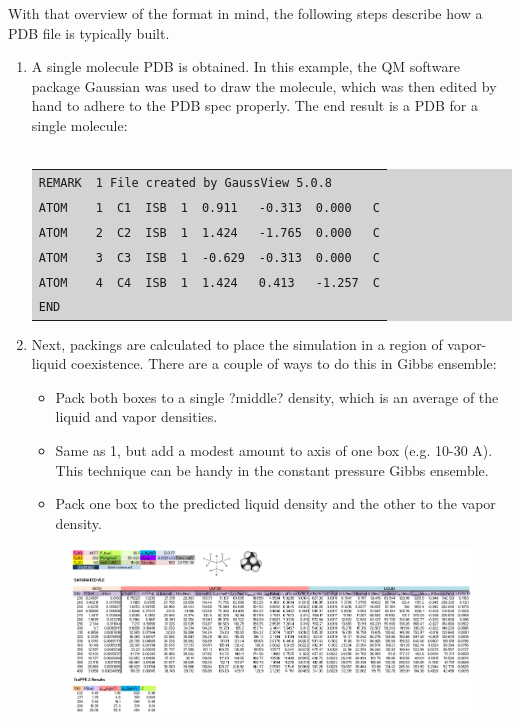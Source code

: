 With that overview of the format in mind, the following steps describe how a PDB file is typically built.\\
\begin{enumerate}
\item A single molecule PDB is obtained. In this example, the QM software package Gaussian was used to draw the molecule, which was then edited by hand to adhere to the PDB spec properly. The end result is a PDB for a single molecule:\\\\
\colorbox{lightgray}{
\begin{tabular}{*9l }
  \texttt{REMARK} & \multicolumn{8}{l}{\texttt{1 File created by GaussView 5.0.8}}  \\
  \texttt{ATOM} & \texttt{1} & \texttt{C1} & \texttt{ISB} & \texttt{1} & \texttt{0.911} & \texttt{-0.313} & \texttt{0.000} & \texttt{C} \\
  \texttt{ATOM} & \texttt{2} & \texttt{C2} & \texttt{ISB} & \texttt{1} & \texttt{1.424} & \texttt{-1.765} & \texttt{0.000} & \texttt{C} \\
  \texttt{ATOM} & \texttt{3} & \texttt{C3} & \texttt{ISB} & \texttt{1} & \texttt{-0.629} & \texttt{-0.313} & \texttt{0.000} & \texttt{C} \\
  \texttt{ATOM} & \texttt{4} & \texttt{C4} & \texttt{ISB} & \texttt{1} & \texttt{1.424} & \texttt{0.413} & \texttt{-1.257} & \texttt{C} \\
  \multicolumn{9}{l}{\texttt{END}} \\
\end{tabular}
}
\item Next, packings are calculated to place the simulation in a region of vapor-liquid coexistence. There are a couple of ways to do this in Gibbs ensemble:
\begin{itemize}
\item Pack both boxes to a single ?middle? density, which is an average of the liquid and vapor densities.
\item Same as 1, but add a modest amount to axis of one box (e.g. 10-30 A).  This technique can be handy in the constant pressure Gibbs ensemble.
\item Pack one box to the predicted liquid density and the other to the vapor density.
\end{itemize}
\begin{figure}[H]
\centering
\includegraphics[scale=1.0]{images/pack2}

\end{figure}
\end{enumerate}
